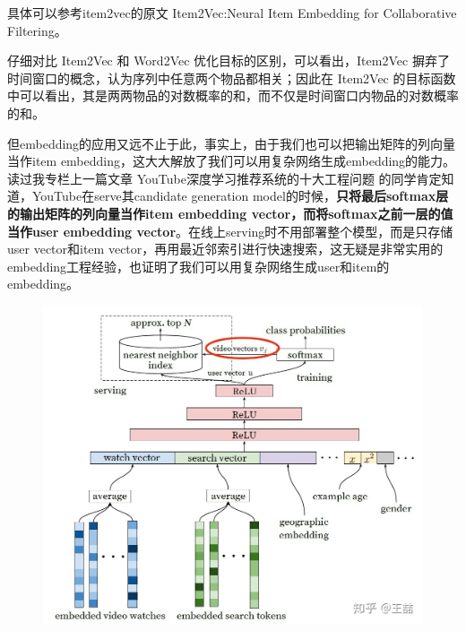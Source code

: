 \documentclass[12pt]{article}
\begin{document}
具体可以参考item2vec的原文 Item2Vec:Neural Item Embedding for Collaborative Filtering。

仔细对比 Item2Vec 和 Word2Vec 优化目标的区别，可以看出，Item2Vec 摒弃了时间窗口的概念，认为序列中任意两个物品都相关；因此在 Item2Vec 的目标函数中可以看出，其是两两物品的对数概率的和，而不仅是时间窗口内物品的对数概率的和。

但embedding的应用又远不止于此，事实上，由于我们也可以把输出矩阵的列向量当作item embedding，这大大解放了我们可以用复杂网络生成embedding的能力。读过我专栏上一篇文章 YouTube深度学习推荐系统的十大工程问题 的同学肯定知道，YouTube在serve其candidate generation model的时候，\textbf{只将最后softmax层的输出矩阵的列向量当作item embedding vector，而将softmax之前一层的值当作user embedding vector}。在线上serving时不用部署整个模型，而是只存储user vector和item vector，再用最近邻索引进行快速搜索，这无疑是非常实用的embedding工程经验，也证明了我们可以用复杂网络生成user和item的embedding。

\begin{figure}[H]
    \centering
    \includegraphics[width=.8\textwidth]{fig/Embedding_In_Youtube_2.jpg}
\end{figure}
\end{document}
